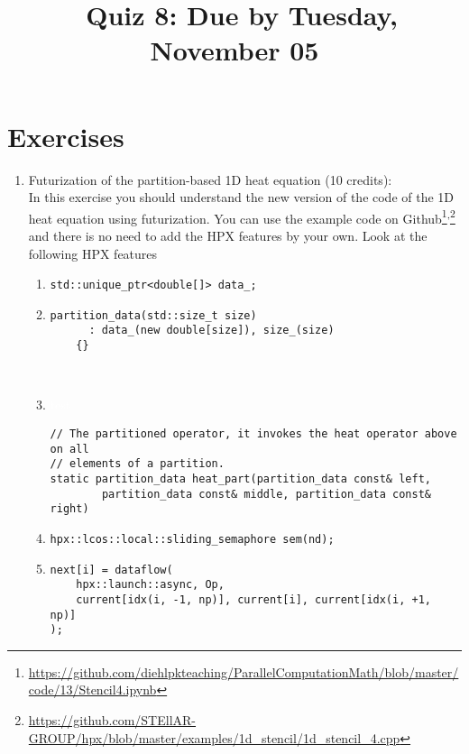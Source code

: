 \documentclass[11pt]{article}
\begin{document}
\title{\coursename~Quiz 8: Due by Tuesday, November 05}
\date{}
\maketitle

\medskip


\section*{Exercises}

\begin{enumerate}
\item Futurization of the partition-based 1D heat equation (10 credits): \\
In this exercise you should understand the new version of the code of the 1D heat equation using futurization. You can use the example code on Github\footnote{\url{https://github.com/diehlpkteaching/ParallelComputationMath/blob/master/code/13/Stencil4.ipynb}}\textsuperscript{,}\footnote{\url{https://github.com/STEllAR-GROUP/hpx/blob/master/examples/1d_stencil/1d_stencil_4.cpp}} and there is no need to add the HPX features by your own. Look at the following HPX features
\begin{enumerate}
\item \lstinline|std::unique_ptr<double[]> data_;|
\item \begin{lstlisting}
partition_data(std::size_t size)
      : data_(new double[size]), size_(size)
    {}
\end{lstlisting} \\
\item \textcolor{white}{test}

\begin{lstlisting}
// The partitioned operator, it invokes the heat operator above on all
// elements of a partition.
static partition_data heat_part(partition_data const& left,
        partition_data const& middle, partition_data const& right)
\end{lstlisting}

\item \lstinline|hpx::lcos::local::sliding_semaphore sem(nd);|

\item \begin{lstlisting}
next[i] = dataflow(
    hpx::launch::async, Op,
    current[idx(i, -1, np)], current[i], current[idx(i, +1, np)]
);
\end{lstlisting}


\end{enumerate}
\end{enumerate}
\end{document}
